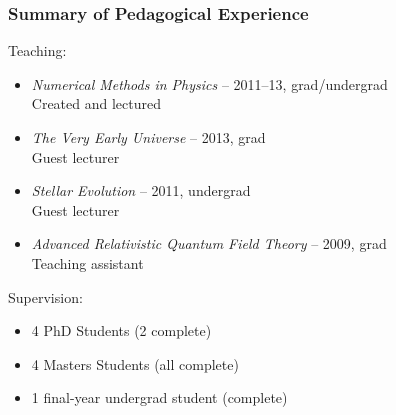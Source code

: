 \documentclass[xcolor=dvipsnames]{beamer}
\begin{document}
\begin{frame}
\frametitle{Summary of Pedagogical Experience}

Teaching:
\begin{itemize}
\item \textit{Numerical Methods in Physics} -- 2011--13, grad/undergrad\\Created and lectured
\item \textit{The Very Early Universe} -- 2013, grad\\Guest lecturer
\item \textit{Stellar Evolution} -- 2011, undergrad\\Guest lecturer
\item \textit{Advanced Relativistic Quantum Field Theory} -- 2009, grad\\Teaching assistant
\end{itemize}\vspace{3mm}

Supervision:
\begin{itemize}
\item 4 PhD Students (2 complete)
\item 4 Masters Students (all complete)
\item 1 final-year undergrad student (complete)
\end{itemize}

\end{frame}
\end{document}
